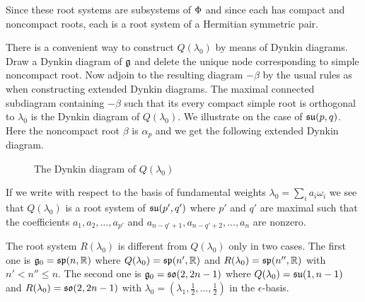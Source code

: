 Since these root systems are subsystems of $\Phi$ and since each has compact and noncompact roots, each is a root system of a Hermitian symmetric pair.

There is a convenient way to construct $Q(\lambda_0)$ by means of Dynkin diagrams. Draw a Dynkin diagram of $\mathfrak{g}$ and delete the unique node corresponding to simple noncompact root. Now adjoin to the resulting diagram $-\beta$ by the usual rules as when constructing extended Dynkin diagrams. The maximal connected subdiagram containing $-\beta$ such that its every compact simple root is orthogonal to $\lambda_0$ is the Dynkin diagram of $Q(\lambda_0)$. We illustrate on the case of $\mathfrak{su}(p,q)$. Here the noncompact root $\beta$ is $\alpha_p$ and we get the following extended Dynkin diagram.
\begin{figure}[H]\label{fig:Q}
  \begin{center}
  \end{center}\caption{The Dynkin diagram of $Q(\lambda_0)$} 
\end{figure}
If we write with respect to the basis of fundamental weights $\lambda_0 = \sum_i a_i \omega_i$ we see that $Q(\lambda_0)$ is a root system of $\mathfrak{su}(p',q')$ where $p'$ and $q'$ are maximal such that the coefficients $a_1,a_2,\ldots,a_{p'}$ and $a_{n-q'+1},a_{n-q'+2}, \ldots, a_n$ are nonzero.

The root system $R(\lambda_0)$ is different from $Q(\lambda_0)$ only in two cases. The first one is $\mathfrak{g}_0=\mathfrak{sp}(n,\mathbb{R})$ where $Q(\lambda_0) = \mathfrak{sp}(n',\mathbb{R})$ and $R(\lambda_0) = \mathfrak{sp}(n'',\mathbb{R})$ with $n' < n'' \leq n$. The second one is $\mathfrak{g}_0=\mathfrak{so}(2,2n-1)$ where $Q(\lambda_0) = \mathfrak{su}(1,n-1)$ and $R(\lambda_0) = \mathfrak{so}(2,2n-1)$ with $\lambda_0 = (\lambda_1,\frac{1}{2},\ldots,\frac{1}{2})$ in the $\epsilon$-basis.

